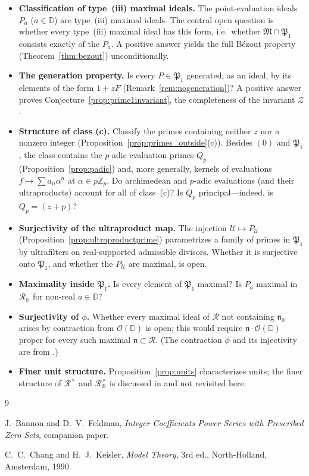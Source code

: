 \documentclass[12pt]{amsart}
\theoremstyle{definition}
\newcommand{\D}{\mathbb{D}}
\newcommand{\Z}{\mathbb{Z}}
\newcommand{\OD}{\mathcal{O}(\D)}
\newcommand{\mR}{\mathcal{R}}
\newcommand{\mRR}{\mathcal{R}_{\mathbb{R}}}
\begin{document}
\begin{itemize}
\item \textbf{Classification of type~(iii) maximal ideals.}  The
  point-evaluation ideals $P_a$ ($a \in \D$) are type~(iii) maximal
  ideals.  The central open question is whether every type~(iii)
  maximal ideal has this form, i.e.\ whether $\mathfrak{M} \cap
  \mathfrak{P}_1$ consists exactly of the $P_a$.  A
  positive answer yields the full B\'ezout property
  (Theorem~\ref{thm:bezout}) unconditionally.

\item \textbf{The generation property.}  Is every $P \in \mathfrak{P}_1$
  generated, as an ideal, by its elements of the form $1 + zF$
  (Remark~\ref{rem:nogeneration})?  A positive answer proves
  Conjecture~\ref{prop:prime1invariant}, the completeness of the
  invariant $\mathcal{Z}$.

\item \textbf{Structure of class (c).}  Classify the primes containing
  neither $z$ nor a nonzero integer
  (Proposition~\ref{prop:primes_outside}(c)).  Besides $(0)$ and
  $\mathfrak{P}_1$, the class contains the $p$-adic evaluation primes
  $Q_p$ (Proposition~\ref{prop:padic}) and, more generally, kernels of
  evaluations $f \mapsto \sum a_n \alpha^n$ at $\alpha \in p\Z_p$.  Do
  archimedean and $p$-adic evaluations (and their ultraproducts)
  account for all of class~(c)?  Is $Q_p$ principal---indeed, is $Q_p =
  (z + p)$?

\item \textbf{Surjectivity of the ultraproduct map.}  The injection
  $\mathcal{U} \mapsto P_\mathcal{U}$
  (Proposition~\ref{prop:ultraproductprime}) parametrizes a family of
  primes in $\mathfrak{P}_1$ by ultrafilters on real-supported
  admissible divisors.  Whether it is surjective onto $\mathfrak{P}_1$,
  and whether the $P_\mathcal{U}$ are maximal, is open.

\item \textbf{Maximality inside $\mathfrak{P}_1$.}  Is every element of
  $\mathfrak{P}_1$ maximal?  Is $P_a$ maximal in $\mRR$ for non-real $a
  \in \D$?

\item \textbf{Surjectivity of $\phi$.}  Whether every maximal ideal of
  $\mR$ not containing $\mathfrak{n}_0$ arises by contraction from $\OD$
  is open; this would require $\mathfrak{n} \cdot \OD$ proper for every
  such maximal $\mathfrak{n} \subset \mR$.  (The contraction $\phi$ and
  its injectivity are from \cite{PaperI}.)

\item \textbf{Finer unit structure.}  Proposition~\ref{prop:units}
  characterizes units; the finer structure of $\mR^\times$ and
  $\mRR^\times$ is discussed in \cite{PaperI} and not revisited here.
\end{itemize}

\begin{thebibliography}{9}

J.~Bannon and D.~V.~Feldman,
\textit{Integer Coefficients Power Series with Prescribed Zero Sets},
companion paper.

C.~C.~Chang and H.~J.~Keisler,
\textit{Model Theory}, 3rd ed.,
North-Holland, Amsterdam, 1990.

\end{thebibliography}
\end{document}
